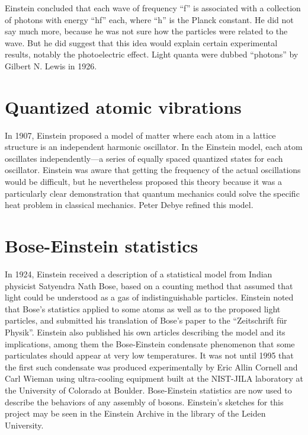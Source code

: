\documentclass[twoside]{memoir}
\begin{document}
Einstein concluded that each wave of frequency \enquote{f} is associated with a collection of photons with energy \enquote{hf} each, where \enquote{h} is the Planck constant. He did not say much more, because he was not sure how the particles were related to the wave. But he did suggest that this idea would explain certain experimental results, notably the photoelectric effect. Light quanta were dubbed \enquote{photons} by Gilbert N. Lewis  in 1926.

\section{Quantized atomic vibrations}\label{quantized-atomic-vibrations}

In 1907, Einstein proposed a model of matter where each atom in a lattice structure is an independent harmonic oscillator. In the Einstein model, each atom oscillates independently---a series of equally spaced quantized states for each oscillator. Einstein was aware that getting the frequency of the actual oscillations would be difficult, but he nevertheless proposed this theory because it was a particularly clear demonstration that quantum mechanics could solve the specific heat problem in classical mechanics. Peter Debye refined this model.\cite{ixm32}

\section{Bose-Einstein statistics}\label{bose-einstein-statistics}

In 1924, Einstein received a description of a statistical model from Indian physicist Satyendra Nath Bose, based on a counting method that assumed that light could be understood as a gas of indistinguishable particles. Einstein noted that Bose's statistics applied to some atoms as well as to the proposed light particles, and submitted his translation of Bose's paper to the \enquote{Zeitschrift für Physik}. Einstein also published his own articles describing the model and its implications, among them the Bose-Einstein condensate  phenomenon that some particulates should appear at very low temperatures. It was not until 1995 that the first such condensate was produced experimentally by Eric Allin Cornell  and Carl Wieman  using ultra-cooling equipment built at the \acrshort{NIST}-JILA laboratory at the University of Colorado  at Boulder.\cite{nlagl} Bose-Einstein statistics are now used to describe the behaviors of any assembly of bosons. Einstein's sketches for this project may be seen in the Einstein Archive in the library of the Leiden University. 
\end{document}
